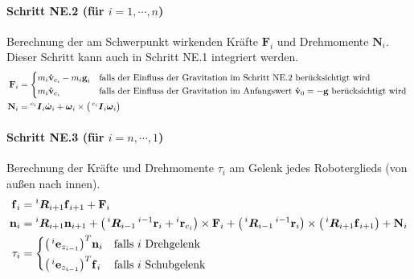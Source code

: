 \documentclass[a4paper, 11pt, accentcolor = tud3b]{tudreport}
\newcommand{\inreferenceto}[2]{\prescript{#1}{}{#2}}
\newcommand{\mat}[1]{\boldsymbol{#1}}
\renewcommand{\vec}[1]{\boldsymbol{\mathbf{#1}}}
\begin{document}
				\paragraph{Schritt NE.2 (für \( i = 1, \cdots, n \))}
					Berechnung der am Schwerpunkt wirkenden Kräfte \( \vec{F}_i \) und Drehmomente \( \vec{N}_i \). Dieser Schritt kann auch in Schritt NE.1 integriert werden.
					\begin{align*}
						\vec{F}_i &=
							\begin{cases*}
								m_i \vec{\dot{v}}_{c_i} - m_i \vec{g}_i & falls der Einfluss der Gravitation im Schritt NE.2 berücksichtigt wird \\
								m_i \vec{\dot{v}}_{c_i}                 & falls der Einfluss der Gravitation im Anfangswert \( \vec{\dot{v}}_0 = -\vec{g} \) berücksichtigt wird
							\end{cases*} \\
						\vec{N}_i &= \inreferenceto{c_i}{\mat{I}}_i \dot{\vec{\omega}}_i + \vec{\omega}_i \times \big( \inreferenceto{c_i}{\mat{I}}_i \vec{\omega}_i \big)
					\end{align*}
				
				\paragraph{Schritt NE.3 (für \( i = n, \cdots, 1 \))}
					Berechnung der Kräfte und Drehmomente \( \tau_i \) am Gelenk jedes Roboterglieds (von außen nach innen).
					\begin{align*}
						\vec{f}_i &= \inreferenceto{i}{\mat{R}}_{i + 1} \vec{f}_{i + 1} + \vec{F}_i \\
						\vec{n}_i &= \inreferenceto{i}{\mat{R}}_{i + 1} \vec{n}_{i + 1} + \big( \inreferenceto{i}{\mat{R}}_{i - 1} \inreferenceto{i - 1}{\vec{r}}_i + \inreferenceto{i}{\vec{r}}_{c_i} \big) \times \vec{F}_i + \big( \inreferenceto{i}{\mat{R}}_{i - 1} \inreferenceto{i - 1}{\vec{r}}_i \big) \times \big( \inreferenceto{i}{\mat{R}}_{i + 1} \vec{f}_{i + 1} \big) + \vec{N}_i \\
						\tau_i &=
							\begin{cases*}
								\big( \inreferenceto{i}{\vec{e}}_{z_{i - 1}} \big)^T \vec{n}_i & falls \(i\) Drehgelenk \\
								\big( \inreferenceto{i}{\vec{e}}_{z_{i - 1}} \big)^T \vec{f}_i & falls \(i\) Schubgelenk
							\end{cases*}
					\end{align*}
			
\end{document}

